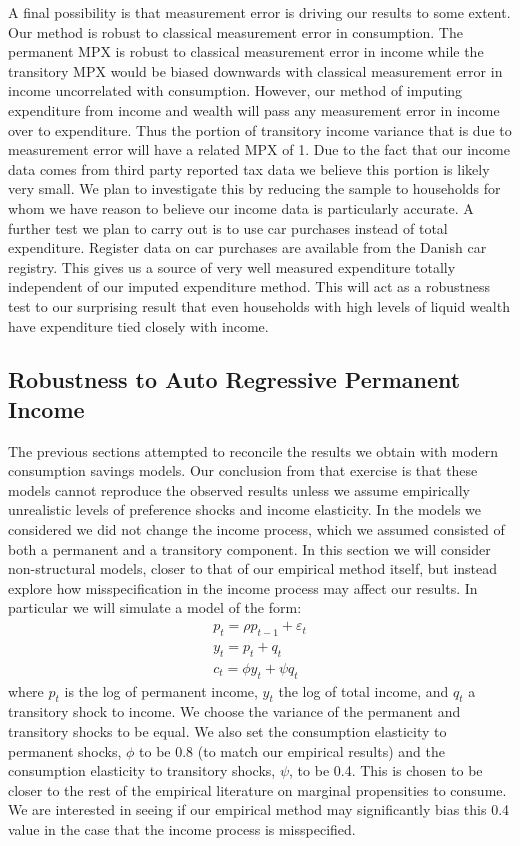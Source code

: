 A final possibility is that measurement error is driving our results to some extent. Our method is robust to classical measurement error in consumption. The permanent MPX is robust to classical measurement error in income while the transitory MPX would be biased downwards with classical measurement error in income uncorrelated with consumption. However, our method of imputing expenditure from income and wealth will pass any measurement error in income over to expenditure. Thus the portion of transitory income variance that is due to measurement error will have a related MPX of 1. Due to the fact that our income data comes from third party reported tax data we believe this portion is likely very small. We plan to investigate this by reducing the sample to households for whom we have reason to believe our income data is particularly accurate. A further test we plan to carry out is to use car purchases instead of total expenditure. Register data on car purchases are available from the Danish car registry. This gives us a source of very well measured expenditure totally independent of our imputed expenditure method. This will act as a robustness test to our surprising result that even households with high levels of liquid wealth have expenditure tied closely with income.

\subsection{Robustness to Auto Regressive Permanent Income}
The previous sections attempted to reconcile the results we obtain with modern consumption savings models. Our conclusion from that exercise is that these models cannot reproduce the observed results unless we assume empirically unrealistic levels of preference shocks and income elasticity. In the models we considered we did not change the income process, which we assumed consisted of both a permanent and a transitory component. In this section we will consider non-structural models, closer to that of our empirical method itself, but instead explore how misspecification in the income process may affect our results. In particular we will simulate a model of the form:
\begin{align*}
p_{t} = \rho p_{t-1} + \varepsilon_{t} \\
y_t = p_t + q_t \\
c_{t} = \phi y_t + \psi q_t
\end{align*}
where $p_t$ is the log of permanent income, $y_t$ the log of total income, and $q_t$ a transitory shock to income. We choose the variance of the permanent and transitory shocks to be equal. We also set the consumption elasticity to permanent shocks, $\phi$ to be 0.8 (to match our empirical results) and the consumption elasticity to transitory shocks, $\psi$, to be 0.4. This is chosen to be closer to the rest of the empirical literature on marginal propensities to consume. We are interested in seeing if our empirical method may significantly bias this 0.4 value in the case that the income process is misspecified.

